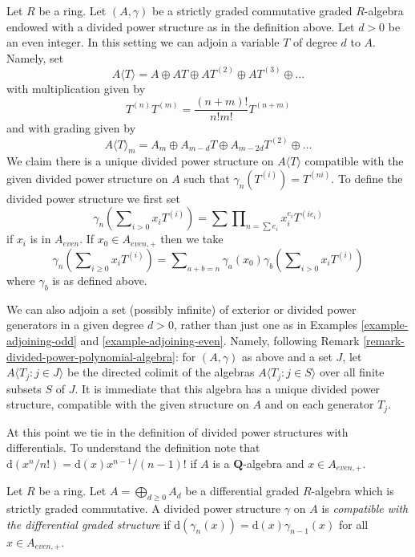 \begin{example}
\label{example-adjoining-even}
Let $R$ be a ring. Let $(A, \gamma)$ be a strictly graded commutative
graded $R$-algebra endowed with a divided power structure as in the
definition above. Let $d > 0$ be an even integer.
In this setting we can adjoin a variable $T$ of degree $d$ to $A$.
Namely, set
$$
A\langle T \rangle = A \oplus AT \oplus AT^{(2)} \oplus AT^{(3)} \oplus \ldots
$$
with multiplication given by
$$
T^{(n)} T^{(m)} = \frac{(n + m)!}{n!m!} T^{(n + m)}
$$
and with grading given by
$$
A\langle T \rangle_m =
A_m \oplus A_{m - d}T \oplus A_{m - 2d}T^{(2)} \oplus \ldots
$$
We claim there is a unique divided power structure on
$A\langle T \rangle$ compatible with the given divided power
structure on $A$ such that $\gamma_n(T^{(i)}) = T^{(ni)}$.
To define the divided power structure we first set
$$
\gamma_n\left(\sum\nolimits_{i > 0} x_i T^{(i)}\right) =
\sum \prod\nolimits_{n = \sum e_i} x_i^{e_i} T^{(ie_i)}
$$
if $x_i$ is in $A_{even}$. If $x_0 \in A_{even, +}$
then we take
$$
\gamma_n\left(\sum\nolimits_{i \geq 0} x_i T^{(i)}\right) =
\sum\nolimits_{a + b = n}
\gamma_a(x_0)\gamma_b\left(\sum\nolimits_{i > 0} x_iT^{(i)}\right)
$$
where $\gamma_b$ is as defined above.
\end{example}

\begin{remark}
\label{remark-adjoining-set-of-variables}
We can also adjoin a set (possibly infinite) of exterior or divided
power generators in a given degree $d > 0$, rather than just one
as in Examples \ref{example-adjoining-odd}
and \ref{example-adjoining-even}. Namely, 
following Remark \ref{remark-divided-power-polynomial-algebra}:
for $(A,\gamma)$
as above and a set $J$, let $A\langle
T_j:j\in J\rangle$ be the directed colimit of the algebras
$A\langle T_j:j\in S\rangle$ over all finite subsets $S$
of $J$. It is immediate that this algebra has a unique divided power
structure, compatible with the given structure on $A$ and on
each generator $T_j$.
\end{remark}

\noindent
At this point we tie in the definition of divided power structures
with differentials. To understand the definition note that
$\text{d}(x^n/n!) = \text{d}(x) x^{n - 1}/(n - 1)!$ if $A$
is a $\mathbf{Q}$-algebra and $x \in A_{even, +}$.

\begin{definition}
\label{definition-divided-powers-dga}
Let $R$ be a ring. Let $A = \bigoplus_{d \geq 0} A_d$ be a
differential graded $R$-algebra which is strictly graded commutative.
A divided power structure $\gamma$ on $A$ is {\it compatible with
the differential graded structure} if
$\text{d}(\gamma_n(x)) = \text{d}(x) \gamma_{n - 1}(x)$ for
all $x \in A_{even, +}$.
\end{definition}

